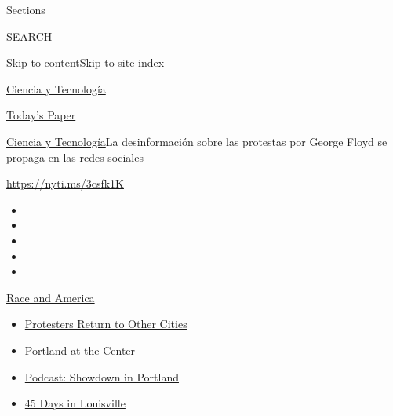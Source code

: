Sections

SEARCH

\protect\hyperlink{site-content}{Skip to
content}\protect\hyperlink{site-index}{Skip to site index}

\href{https://www.nytimes.com/es/section/ciencia-y-tecnologia}{Ciencia y
Tecnología}

\href{https://myaccount.nytimes.com/auth/login?response_type=cookie\&client_id=vi}{}

\href{https://www.nytimes.com/section/todayspaper}{Today's Paper}

\href{/es/section/ciencia-y-tecnologia}{Ciencia y
Tecnología}\textbar{}La desinformación sobre las protestas por George
Floyd se propaga en las redes sociales

\url{https://nyti.ms/3csfk1K}

\begin{itemize}
\item
\item
\item
\item
\item
\end{itemize}

\href{https://www.nytimes.com/news-event/george-floyd-protests-minneapolis-new-york-los-angeles?action=click\&pgtype=Article\&state=default\&region=TOP_BANNER\&context=storylines_menu}{Race
and America}

\begin{itemize}
\tightlist
\item
  \href{https://www.nytimes.com/2020/07/26/us/protests-portland-seattle-trump.html?action=click\&pgtype=Article\&state=default\&region=TOP_BANNER\&context=storylines_menu}{Protesters
  Return to Other Cities}
\item
  \href{https://www.nytimes.com/2020/07/24/us/portland-oregon-protests-white-race.html?action=click\&pgtype=Article\&state=default\&region=TOP_BANNER\&context=storylines_menu}{Portland
  at the Center}
\item
  \href{https://www.nytimes.com/2020/07/23/podcasts/the-daily/portland-protests.html?action=click\&pgtype=Article\&state=default\&region=TOP_BANNER\&context=storylines_menu}{Podcast:
  Showdown in Portland}
\item
  \href{https://www.nytimes.com/interactive/2020/07/16/us/black-lives-matter-protests-louisville-breonna-taylor.html?action=click\&pgtype=Article\&state=default\&region=TOP_BANNER\&context=storylines_menu}{45
  Days in Louisville}
\end{itemize}

